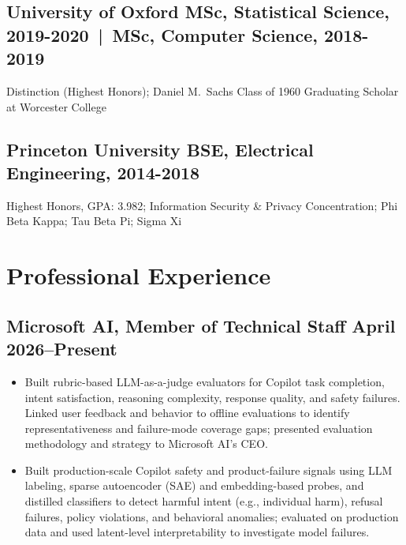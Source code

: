 \documentclass[a4,10pt]{article}
\newcommand{\subtext}[1]{#1\par\vspace{-0.2cm}}
\newenvironment{zitemize}{
  \begin{itemize}\itemsep0pt\parskip0pt\parsep1pt}
  {\end{itemize}\vspace{-0.4cm}}
\begin{document}
\subsection*{University of Oxford \hfill MSc, Statistical Science, 2019-2020 \,|\, MSc, Computer Science, 2018-2019}
\subtext{Distinction (Highest Honors); Daniel M.~Sachs Class of 1960 Graduating Scholar at Worcester College}

\subsection*{Princeton University \hfill BSE, Electrical Engineering, 2014-2018}
\subtext{Highest Honors, GPA: 3.982; Information Security \& Privacy Concentration; Phi Beta Kappa; Tau Beta Pi; Sigma Xi}

\vspace{-0.8em}
\section{Professional Experience}
\vspace{-0.5em}

\subsection*{Microsoft AI, Member of Technical Staff \hfill April 2026--Present}
\begin{zitemize}
\item Built rubric-based LLM-as-a-judge evaluators for Copilot task completion, intent satisfaction, reasoning complexity, response quality, and safety failures. Linked user feedback and behavior to offline evaluations to identify representativeness and failure-mode coverage gaps; presented evaluation methodology and strategy to Microsoft AI's CEO.
\item Built production-scale Copilot safety and product-failure signals using LLM labeling, sparse autoencoder (SAE) and embedding-based probes, and distilled classifiers to detect harmful intent (e.g., individual harm), refusal failures, policy violations, and behavioral anomalies; evaluated on production data and used latent-level interpretability to investigate model failures.
\end{zitemize}

\vspace{0.25em}
\end{document}
